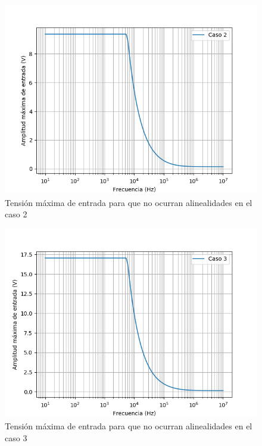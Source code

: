 \begin{figure}[H]
\begin{centering}
\includegraphics[scale=0.5]{../Ex1/ib/Resources1b/AmplMaxVsFreq2}
\par\end{centering}
\caption{Tensión máxima de entrada para que no ocurran alinealidades en el
caso 2}
\label{1_b_28}
\end{figure}

\begin{figure}[H]
\begin{centering}
\includegraphics[scale=0.5]{../Ex1/ib/Resources1b/AmplMaxVsFreq3}
\par\end{centering}
\caption{Tensión máxima de entrada para que no ocurran alinealidades en el
caso 3}
\label{1_b_29}
\end{figure}

